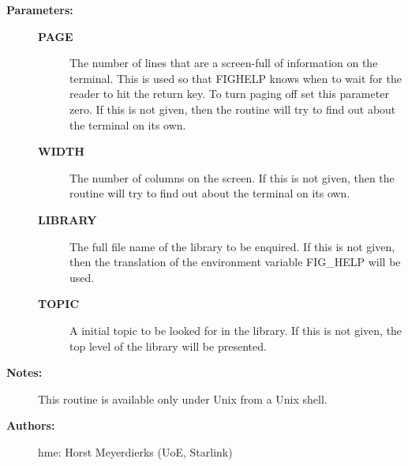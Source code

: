 \begin{description}
\item [{\bf Parameters:}]
\begin{description}
\item [{\bf PAGE}]
 The number of lines that are a screen-full of information on
 the terminal. This is used so that FIGHELP knows when to wait
 for the reader to hit the return key. To turn paging off set
 this parameter zero. If this is not given, then the routine will
 try to find out about the terminal on its own.
\item [{\bf WIDTH}]
 The number of columns on the screen. If this is not given, then
 the routine will try to find out about the terminal on its own.
\item [{\bf LIBRARY}]
 The full file name of the library to be enquired. If this is
 not given, then the translation of the environment variable
 FIG_HELP will be used.
\item [{\bf TOPIC}]
 A initial topic to be looked for in the library. If this is not
 given, the top level of the library will be presented.
\end{description}

\item [{\bf Notes:}]
 This routine is available only under Unix from a Unix shell.

\item [{\bf Authors:}]
 hme: Horst Meyerdierks (UoE, Starlink)
\end{description}
